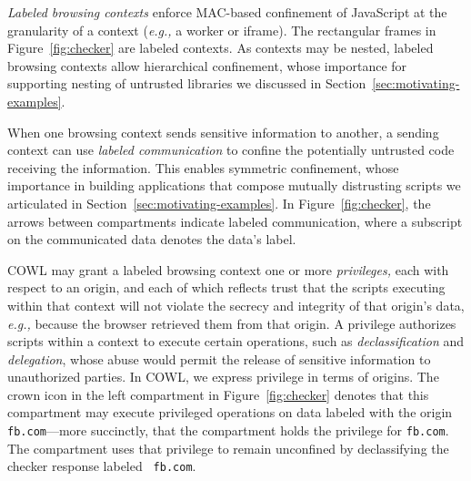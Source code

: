 
{\em Labeled browsing contexts} enforce MAC-based confinement of
JavaScript at the granularity of a context (\emph{e.g.,} a worker or
iframe). The rectangular frames in Figure~\ref{fig:checker} are
labeled contexts. As contexts may be nested, labeled browsing
contexts allow hierarchical confinement, whose importance for
supporting nesting of untrusted libraries we discussed in
Section~\ref{sec:motivating-examples}.

When one browsing context sends sensitive information to another, a
sending context can use \emph{labeled communication} to confine the
potentially untrusted code receiving the information. This enables
symmetric confinement, whose importance in building applications that
compose mutually distrusting scripts we articulated in
Section~\ref{sec:motivating-examples}. In Figure~\ref{fig:checker},
the arrows between compartments indicate labeled communication, where
a subscript on the communicated data denotes the data's label.

COWL may grant a labeled browsing context one or more {\em
privileges,} each with respect to an origin, and each of which
reflects trust that the scripts executing within that context will not
violate the secrecy and integrity of that origin's data, \emph{e.g.,}
because the browser retrieved them from that origin. A privilege
authorizes scripts within a context to execute certain operations,
such as {\em declassification} and {\em delegation}, whose abuse would
permit the release of sensitive information to unauthorized parties.
In COWL, we express privilege in terms of origins. The crown icon in
the left compartment in Figure~\ref{fig:checker} denotes that this
compartment may execute privileged operations on data labeled with the
origin {\tt fb.com}---more succinctly, that the compartment holds the
privilege for {\tt fb.com}. The compartment uses that privilege to
remain unconfined by declassifying the checker response labeled {\tt
fb.com}.


